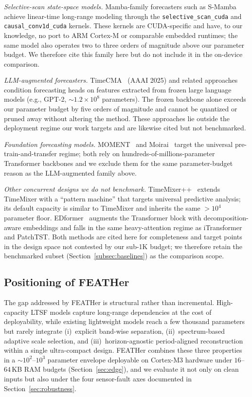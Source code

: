 \documentclass[journal]{IEEEtran}
\theoremstyle{remark}
\begin{document}
\emph{Selective-scan state-space models.}
Mamba-family forecasters such as
S-Mamba~\cite{Wang2024SMamba} achieve linear-time long-range modeling
through the \texttt{selective\_scan\_cuda} and
\texttt{causal\_conv1d\_cuda} kernels. These kernels are CUDA-specific
and have, to our knowledge, no port to ARM Cortex-M or comparable
embedded runtimes; the same model also operates two to three orders of
magnitude above our parameter budget. We therefore cite this family
here but do not include it in the on-device comparison.

\emph{LLM-augmented forecasters.}
TimeCMA~\cite{Liu2025TimeCMA} (AAAI 2025) and related approaches
condition forecasting heads on features extracted from frozen large
language models (e.g., GPT-2, $\sim$$1.2\!\times\!10^{8}$ parameters).
The frozen backbone alone exceeds our parameter budget by five orders
of magnitude and cannot be quantized or pruned away without altering
the method. These approaches lie outside the deployment regime our
work targets and are likewise cited but not benchmarked.

\emph{Foundation forecasting models.}
MOMENT~\cite{Goswami2024Moment} and Moirai~\cite{Woo2024Moirai}
target the universal pre-train-and-transfer regime; both rely on
hundreds-of-millions-parameter Transformer backbones and we exclude
them for the same parameter-budget reason as the LLM-augmented
family above.

\emph{Other concurrent designs we do not benchmark.}
TimeMixer++~\cite{Wang2024TimeMixerPP} extends TimeMixer with a
``pattern machine'' that targets universal predictive analysis; its
default capacity is similar to TimeMixer and inherits the same
$>$$10^{4}$ parameter floor. EDformer~\cite{Chen2024EDformer}
augments the Transformer block with decomposition-aware embeddings
and falls in the same heavy-attention regime as iTransformer and
PatchTST. Both methods are cited here for completeness and target
points in the design space not contested by our sub-1K budget; we
therefore retain the benchmarked subset
(Section~\ref{subsec:baselines}) as the comparison scope.

\subsection{Positioning of FEATHer}
The gap addressed by FEATHer is structural rather than incremental.
High-capacity LTSF models capture long-range dependencies at the cost
of deployability, while existing lightweight models reach a few
thousand parameters but rarely integrate (i)~explicit band-wise
separation, (ii)~spectrum-based adaptive scale selection, and
(iii)~horizon-agnostic period-aligned reconstruction within a single
ultra-compact design. FEATHer combines these three properties in a
$\sim$$10^{2}$--$10^{3}$ parameter envelope deployable on Cortex-M3
hardware under $16$--$64$\,KB RAM budgets
(Section~\ref{sec:edge}), and we evaluate it not only on clean inputs
but also under the four sensor-fault axes documented in
Section~\ref{sec:robustness}.
\end{document}
